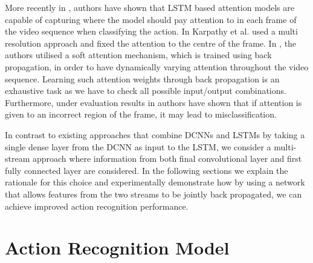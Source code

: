 \documentclass[10pt,twocolumn,letterpaper]{article}
\begin{document}
	
	More recently in \cite{Sharma2015,Yao2015}, authors have shown that LSTM based attention models are capable of capturing where the model should pay attention to in each frame of the video sequence when classifying the action. In \cite{Karpathy2014} Karpathy et al. used a multi resolution approach and fixed the attention to the centre of the frame. In \cite{Sharma2015}, the authors utilised a soft attention mechanism, which is trained using back propagation, in order to have dynamically varying attention throughout the video sequence. Learning such attention weights through back propagation is an exhaustive task as we have to check all possible input/output combinations. Furthermore, under evaluation results in \cite{Sharma2015} authors have shown that if attention is given to an incorrect region of the frame, it may lead to misclassification. 
	
	
	In contrast to existing approaches that combine DCNNs and LSTMs by taking a single dense layer from the DCNN as input to the LSTM, we consider a multi-stream approach where information from both final convolutional layer and first fully connected layer are considered. In the following sections we explain the rationale for this choice and experimentally demonstrate how by using a network that allows features from the two streams to be jointly back propagated, we can achieve improved action recognition performance.    	    


% 
   
\section{Action Recognition Model}
\end{document}
